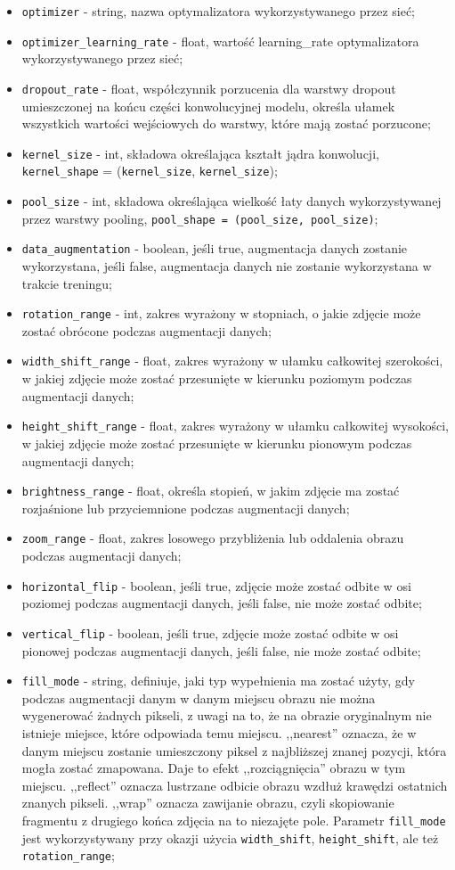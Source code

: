 \begin{itemize}
    \item \verb|optimizer| - string, nazwa optymalizatora wykorzystywanego przez sieć;
    \item \verb|optimizer_learning_rate| - float, wartość learning\_rate optymalizatora wykorzystywanego przez sieć;
    \item \verb|dropout_rate| - float, współczynnik porzucenia dla warstwy dropout umieszczonej na końcu części konwolucyjnej modelu, określa ułamek wszystkich wartości wejściowych do warstwy, które mają zostać porzucone; 
    \item \verb|kernel_size| - int, składowa określająca kształt jądra konwolucji, \verb|kernel_shape| = (\verb|kernel_size|, \verb|kernel_size|);
    \item \verb|pool_size| - int, składowa określająca wielkość łaty danych wykorzystywanej przez warstwy pooling, \verb|pool_shape = (pool_size, pool_size)|;
    \item \verb|data_augmentation| - boolean, jeśli true, augmentacja danych zostanie wykorzystana, jeśli false, augmentacja danych nie zostanie wykorzystana w trakcie treningu;
    \item \verb|rotation_range| - int, zakres wyrażony w stopniach, o jakie zdjęcie może zostać obrócone podczas augmentacji danych;
    \item \verb|width_shift_range| - float, zakres wyrażony w ułamku całkowitej szerokości, w jakiej zdjęcie może zostać przesunięte w kierunku poziomym podczas augmentacji danych;
    \item \verb|height_shift_range| - float, zakres wyrażony w ułamku całkowitej wysokości, w jakiej zdjęcie może zostać przesunięte w kierunku pionowym podczas augmentacji danych;
    \item \verb|brightness_range| - float, określa stopień, w jakim zdjęcie ma zostać rozjaśnione lub przyciemnione podczas augmentacji danych;
    \item \verb|zoom_range| - float, zakres losowego przybliżenia lub oddalenia obrazu podczas augmentacji danych;
    \item \verb|horizontal_flip| - boolean, jeśli true, zdjęcie może zostać odbite w osi poziomej podczas augmentacji danych, jeśli false, nie może zostać odbite;
    \item \verb|vertical_flip| - boolean, jeśli true, zdjęcie może zostać odbite w osi pionowej podczas augmentacji danych, jeśli false, nie może zostać odbite; 
    \item \verb|fill_mode| - string, definiuje, jaki typ wypełnienia ma zostać użyty, gdy podczas augmentacji danym w danym miejscu obrazu nie można wygenerować żadnych pikseli, z uwagi na to, że na obrazie oryginalnym nie istnieje miejsce, które odpowiada temu miejscu. ,,nearest'' oznacza, że w danym miejscu zostanie umieszczony piksel z najbliższej znanej pozycji, która mogła zostać zmapowana. Daje to efekt ,,rozciągnięcia'' obrazu w tym miejscu. ,,reflect'' oznacza lustrzane odbicie obrazu wzdłuż krawędzi ostatnich znanych pikseli. ,,wrap'' oznacza zawijanie obrazu, czyli skopiowanie fragmentu z drugiego końca zdjęcia na to niezajęte pole. Parametr \verb|fill_mode| jest wykorzystywany przy okazji użycia \verb|width_shift|, \verb|height_shift|, ale też \verb|rotation_range|;

\end{itemize}
